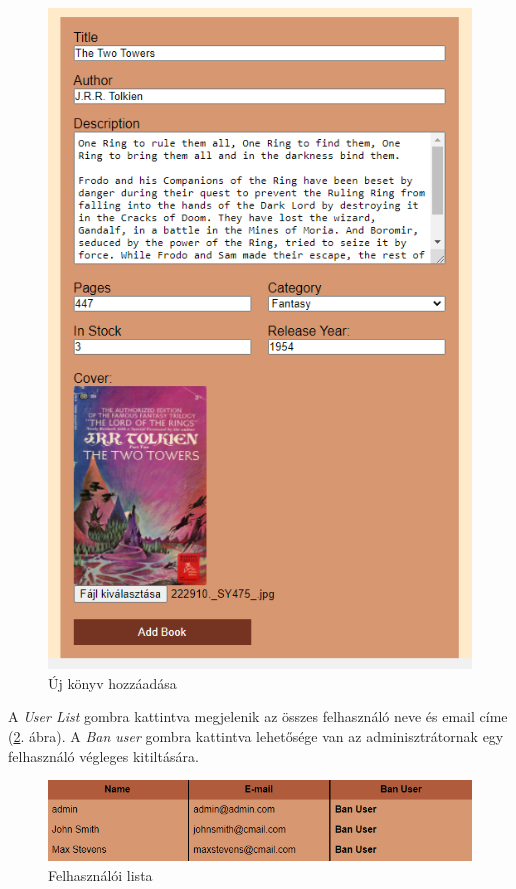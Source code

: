 \begin{figure}[h]
    \centering
    \includegraphics[scale=0.6]{images/application/newbook.png}
    \caption{Új könyv hozzáadása}
    \label{fig:newbook}
\end{figure}

A \textit{User List} gombra kattintva megjelenik az összes felhasználó neve és email címe (\ref{fig:userlist}. ábra). A \textit{Ban user} gombra kattintva lehetősége van az adminisztrátornak egy felhasználó végleges kitiltására.

\begin{figure}[h]
    \centering
    \includegraphics[scale=0.6]{images/application/userlist.png}
    \caption{Felhasználói lista}
    \label{fig:userlist}
\end{figure}

